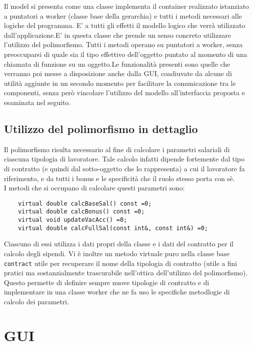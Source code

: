 \documentclass[a4paper,10pt]{article}
\begin{document}
Il model si presenta come una classe implementa il container realizzato istanziato a puntatori a worker (classe base della gerarchia) e tutti i metodi necessari alle logiche del programma. E' a tutti gli effetti il modello logico che verrà utilizzato dall'applicazione.E' in questa classe che prende un senso concreto utilizzare l'utilizzo del polimorfismo. Tutti i metodi operano su puntatori a worker, senza preoccuparsi di quale sia il tipo effettivo dell'oggetto puntato al momento di una chiamata di funzione su un oggetto.Le funzionalità presenti sono quelle che verranno poi messe a disposizione anche dalla GUI, coadiuvate da alcune di utilità aggiunte in un secondo momento per facilitare la comunicazione tra le componenti, senza però vincolare l'utilizzo del modello all'interfaccia proposta e esaminata nel seguito.

\subsection{Utilizzo del polimorfismo in dettaglio}

Il polimorfismo risulta necessario al fine di calcolare i parametri salariali di ciascuna tipologia di lavoratore. Tale calcolo infatti dipende fortemente dal tipo di contratto (e quindi dal sotto-oggetto che lo rappresenta) a cui il lavoratore fa riferimento, e da tutti i bonus e le specificità che il ruolo stesso porta con sè.\\ 
I metodi che si occupano di calcolare questi parametri sono:
\begin{verbatim}
    virtual double calcBaseSal() const =0; 
    virtual double calcBonus() const =0; 
    virtual void updateVacAcc() =0; 
    virtual double calcFullSal(const int&, const int&) =0; 
\end{verbatim}
Ciascuno di essi utilizza i dati propri della classe e i dati del contratto per il calcolo degli sipendi.
Vi è inoltre un metodo virtuale puro nella classe base \verb+contract+ utile per recuperare il nome della tipologia di contratto (utile a fini pratici ma sostanzialmente trascurabile nell'ottica dell'utilizzo del polimorfismo). Questo permette di definire sempre nuove tipologie di contratto e di implementare in una classe worker che ne fa uso le specifiche metodlogie di calcolo dei parametri.

\section{GUI}
\end{document}

